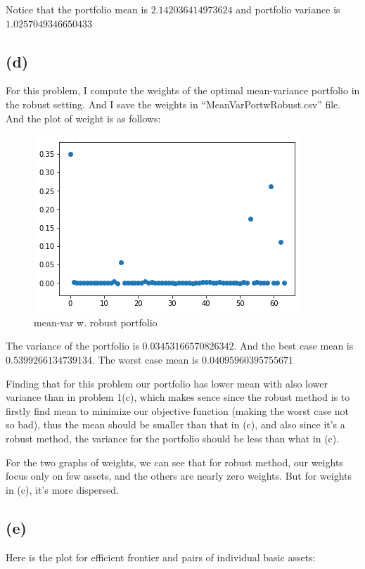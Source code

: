 \documentclass[letterpaper,11pt]{article}
\begin{document}
\begin{spacing}{1.2}
Notice that the portfolio mean is $2.142036414973624$ and portfolio variance is $1.0257049346650433$

\subsection*{(d)}
For this problem, I compute the weights of the optimal mean-variance portfolio in the robust setting. And I save the weights in ``MeanVarPortwRobust.csv'' file. And the plot of weight is as follows:

\begin{figure}[h] %
\centering
\includegraphics[scale=0.5]{1(d)new.png}
\caption{mean-var w. robust portfolio}
\label{fig:label}
\end{figure}

The variance of the portfolio is $0.03453166570826342$. And the best case mean is $0.5399266134739134$. The worst case mean is $0.04095960395755671$


Finding that for this problem our portfolio has lower mean with also lower variance than in problem 1(c), which makes sence since the robust method is to firstly find mean to minimize our objective function (making the worst case not so bad), thus the mean should be smaller than that in (c), and also since it's a robust method, the variance for the portfolio should be less than what in (c).

For the two graphs of weights, we can see that for robust method, our weights focus only on few assets, and the others are nearly zero weights. But for weights in (c), it's more dispersed. 

\subsection*{(e)}

Here is the plot for efficient frontier and pairs of individual basic assets:


\end{spacing}
\end{document}
